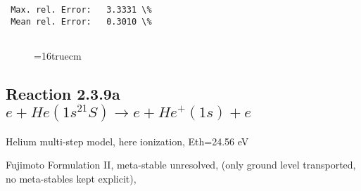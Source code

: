 \documentclass[12pt,dvipdfmx]{article}
\begin{document}
\begin{small}
\begin{verbatim}
 Max. rel. Error:   3.3331 \%
 Mean rel. Error:   0.3010 \%


\end{verbatim}\end{small}
\begin{figure} \label{2.2.14}
\epsfxsize=16truecm
\end{figure}
\newpage




\subsection{
Reaction 2.3.9a  $e + He(1s^21S) \rightarrow  e + He^+(1s) + e $
}
Helium multi-step model, here ionization, Eth=24.56 eV

 Fujimoto Formulation II, meta-stable unresolved, (only ground level transported, no meta-stables
 kept explicit), \cite{kn:Fujimoto}
\end{document}
